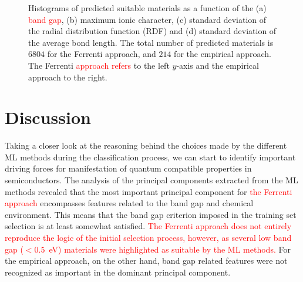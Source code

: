 \documentclass[superscriptaddress,unsortedaddress,
 amsmath,amssymb,
 aps,
]{revtex4-2}
\newcommand{\mrk}[1]{\textcolor{red}{#1}}
\begin{document}
\begin{figure}[t]
    \begin{subfigure}[b]{1\textwidth}
    \centering
    
  \end{subfigure}
  \par\bigskip
\begin{subfigure}[b]{0.45\textwidth}
    
    \subcaption{}
\end{subfigure}
\begin{subfigure}[b]{0.45\textwidth}
    
    \subcaption{}
\end{subfigure}%

\begin{subfigure}[b]{0.45\textwidth}
    
    \subcaption{}
\end{subfigure}
\begin{subfigure}[b]{0.45\textwidth}
    
    \subcaption{}
\end{subfigure}
\caption{Histograms of predicted suitable materials as a function of the (a) \mrk{band gap}, (b) maximum ionic character, (c) standard deviation of the radial distribution function (RDF) and (d) standard deviation of the average bond length. The total number of predicted materials is  $6804$ for the Ferrenti approach, and $214$ for the empirical approach. The Ferrenti \mrk{approach refers} to the left $y$-axis and the empirical approach to the right.
}
\label{fig:histogram_new}
\end{figure}

\section*{Discussion} 

Taking a closer look at the reasoning behind the choices made by the different ML methods during the classification process, we can start to identify important driving forces for manifestation of quantum compatible properties in semiconductors. 
The analysis of the principal components extracted from the ML methods revealed that the most important principal component for \mrk{the Ferrenti approach} encompasses features related to the band gap and chemical environment. This means that the band gap criterion imposed in the training set selection is at least somewhat satisfied. 
\mrk{The Ferrenti approach does not entirely reproduce the logic of the initial selection process, however, as several low band gap ($<0.5$~eV) materials were highlighted as suitable by the ML methods.}  
For the empirical approach, on the other hand, band gap related features were not recognized as important in the dominant principal component. 
\end{document}
